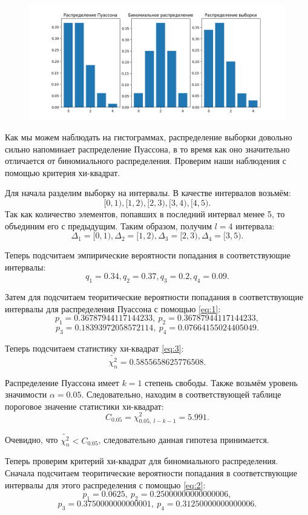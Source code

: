 \documentclass[12pt]{article}
\begin{document}
\begin{figure}[h]
    \includegraphics[width=\textwidth]{hist}
    \centering
\end{figure}

Как мы можем наблюдать на гистограммах, распределение выборки довольно
сильно напоминает распределение Пуассона, в то время как оно значительно
отличается от биномиального распределения. Проверим наши наблюдения с помощью
критерия хи-квадрат.

Для начала разделим выборку на интервалы. В качестве интервалов возьмём:
$$[0, 1), [1, 2), [2, 3), [3, 4), [4, 5).$$ 
Так как количество элементов, попавших в 
последний интервал менее 5, то объединим его с предыдущим. 
Таким образом, получим
$l = 4$ интервала: $$\Delta_1 = [0, 1), \Delta_2 = [1, 2), \Delta_3 = [2, 3), \Delta_4 = [3, 5).$$

Теперь подсчитаем эмпирические вероятности попадания в соответствующие интервалы:
$$q_1 = 0.34, q_2 = 0.37, q_3 = 0.2, q_4 = 0.09.$$

Затем для подсчитаем теоритические вероятности 
попадания в соответствующие интервалы для распределения Пуассона
с помощью \eqref{eq:1}:
$$p_1 = 0.36787944117144233,\  p_2 = 0.36787944117144233,$$$$ p_3 = 0.18393972058572114, 
\  p_4 = 0.07664155024405049.$$

Теперь подсчитаем статистику хи-квадрат \eqref{eq:3}:
$$\widetilde{\chi^2_n} = 0.5855658625776508.$$

Распределение Пуассона имеет $k = 1$ степень свободы. Также
возьмём уровень значимости $\alpha = 0.05$. Следовательно,
находим в соответствующей таблице пороговое значение статистики хи-квадрат:
$$C_{0.05} = \chi^2_{0.05,\  l - k - 1} = 5.991.$$

Очевидно, что $\widetilde{\chi^2_n} < C_{0.05}$, следовательно данная гипотеза принимается.

Теперь проверим критерий хи-квадрат для биномиального распределения.
Сначала подсчитаем теоритические вероятности 
попадания в соответствующие интервалы для этого распределения
с помощью \eqref{eq:2}:
$$p_1 = 0.0625,\  p_2 = 0.25000000000000006,$$$$ p_3 = 0.3750000000000001, 
\  p_4 = 0.31250000000000006.$$
\end{document}
